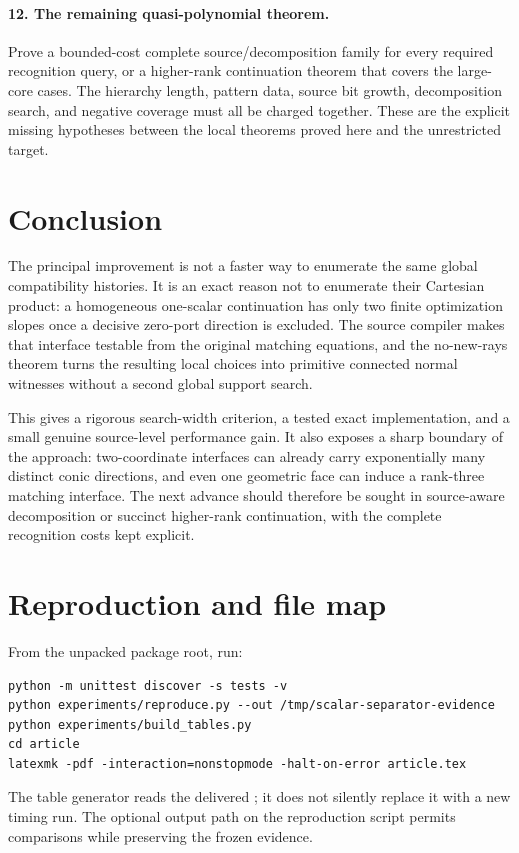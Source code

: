 \paragraph{12. The remaining quasi-polynomial theorem.}
Prove a bounded-cost complete source/decomposition family for every required
recognition query, or a higher-rank continuation theorem that covers the
large-core cases. The hierarchy length, pattern data, source bit growth,
decomposition search, and negative coverage must all be charged together.
These are the explicit missing hypotheses between the local theorems proved
here and the unrestricted target.

\section{Conclusion}

The principal improvement is not a faster way to enumerate the same global
compatibility histories. It is an exact reason not to enumerate their Cartesian
product: a homogeneous one-scalar continuation has only two finite optimization
slopes once a decisive zero-port direction is excluded. The source compiler
makes that interface testable from the original matching equations, and the
no-new-rays theorem turns the resulting local choices into primitive connected
normal witnesses without a second global support search.

This gives a rigorous search-width criterion, a tested exact implementation,
and a small genuine source-level performance gain. It also exposes a sharp
boundary of the approach: two-coordinate interfaces can already carry
exponentially many distinct conic directions, and even one geometric face can
induce a rank-three matching interface. The next advance should therefore be
sought in source-aware decomposition or succinct higher-rank continuation,
with the complete recognition costs kept explicit.

\appendix
\section{Reproduction and file map}

From the unpacked package root, run:
\begin{verbatim}
python -m unittest discover -s tests -v
python experiments/reproduce.py --out /tmp/scalar-separator-evidence
python experiments/build_tables.py
cd article
latexmk -pdf -interaction=nonstopmode -halt-on-error article.tex
\end{verbatim}
The table generator reads the delivered ; it does
not silently replace it with a new timing run. The optional output path on the
reproduction script permits comparisons while preserving the frozen evidence.

